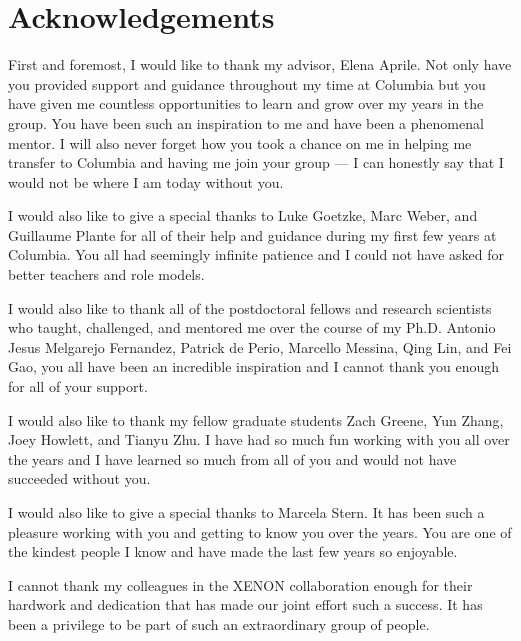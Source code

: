 
\cleartorecto %
\chapter{Acknowledgements} %
\thispagestyle{plain} %



First and foremost, I would like to thank my advisor, Elena Aprile.  Not only have you provided support and guidance throughout my time at Columbia but you have given me countless opportunities to learn and grow over my years in the group.  You have been such an inspiration to me and have been a phenomenal mentor.  I will also never forget how you took a chance on me in helping me transfer to Columbia and having me join your group --- I can honestly say that I would not be where I am today without you.


I would also like to give a special thanks to Luke Goetzke, Marc Weber, and Guillaume Plante for all of their help and guidance during my first few years at Columbia.  You all had seemingly infinite patience and I could not have asked for better teachers and role models.


I would also like to thank all of the postdoctoral fellows and research scientists who taught, challenged, and mentored me over the course of my Ph.D.  Antonio Jesus Melgarejo Fernandez, Patrick de Perio, Marcello Messina, Qing Lin, and Fei Gao, you all have been an incredible inspiration and I cannot thank you enough for all of your support.  


I would also like to thank my fellow graduate students Zach Greene, Yun Zhang, Joey Howlett, and Tianyu Zhu.  I have had so much fun working with you all over the years and I have learned so much from all of you and would not have succeeded without you.  


I would also like to give a special thanks to Marcela Stern.  It has been such a pleasure working with you and getting to know you over the years.  You are one of the kindest people I know and have made the last few years so enjoyable.


I cannot thank my colleagues in the XENON collaboration enough for their hardwork and dedication that has made our joint effort such a success.  It has been a privilege to be part of such an extraordinary group of people.


